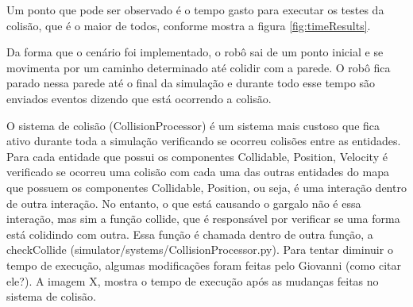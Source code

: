 Um ponto que pode ser observado é o tempo gasto para executar os testes da colisão, que é o maior de todos, conforme mostra a figura \ref{fig:timeResults}.

Da forma que o cenário foi implementado, o robô sai de um ponto inicial e se movimenta por um caminho determinado até colidir com a parede. O robô fica parado nessa parede até o final da simulação e durante todo esse tempo são enviados eventos dizendo que está ocorrendo a colisão.

O sistema de colisão (CollisionProcessor) é um sistema mais custoso que fica ativo durante toda a simulação verificando se ocorreu colisões entre as entidades. Para cada entidade que possui os componentes Collidable, Position, Velocity é verificado se ocorreu uma colisão com cada uma das outras entidades do mapa que possuem os componentes Collidable, Position, ou seja, é uma interação dentro de outra interação. No entanto, o que está causando o gargalo não é essa interação, mas sim a função collide, que é responsável por verificar se uma forma está colidindo com outra. Essa função é chamada dentro de outra função, a checkCollide (simulator/systems/CollisionProcessor.py). Para tentar diminuir o tempo de execução, algumas modificações foram feitas pelo Giovanni (como citar ele?). A imagem X, mostra o tempo de execução após as mudanças feitas no sistema de colisão.

